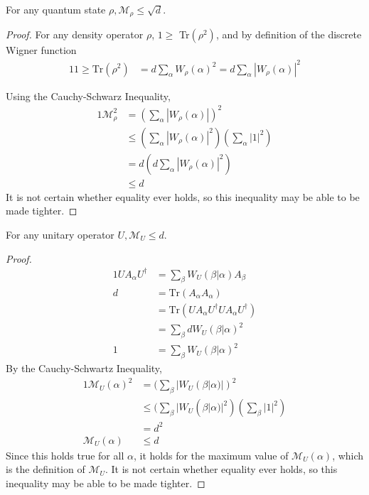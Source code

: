 \documentclass[../3Wworkreport.tex]{subfiles}
\begin{document}
\begin{prop}\label{prop:manarho}
For any quantum state $\rho, \mathcal{M}_\rho \le \sqrt{d}$.
\end{prop}
\begin{proof}
	For any density operator $\rho$, $1 \ge $ Tr$(\rho^2)$, and by definition of the discrete Wigner function
	\begin{alignat}{1}
		1 \ge \text{Tr}(\rho^2) &= d \sum\limits_\alpha W_\rho(\alpha)^2 = d \sum\limits_\alpha |W_\rho(\alpha)|^2
	\end{alignat}

	Using the Cauchy-Schwarz Inequality,
	\begin{alignat}{1}
		\mathcal{M}_\rho^2 &= (\sum\limits_\alpha |W_\rho(\alpha)|)^2\\
		& \le (\sum\limits_\alpha |W_\rho(\alpha)|^2) (\sum\limits_\alpha |1|^2)\\
		&= d (d \sum\limits_\alpha |W_\rho(\alpha)|^2)\\
		& \le d
	\end{alignat}
	It is not certain whether equality ever holds, so this inequality may be able to be made tighter.
\end{proof}
\newpage

\begin{prop}\label{prop:manaunitary}
For any unitary operator $U, \mathcal{M}_U \le d$.
\end{prop}
\begin{proof}
	\begin{alignat}{1}
		U A_\alpha U^\dag &= \sum\limits_\beta W_U (\beta | \alpha) A_\beta\\
		d &= \text{Tr}(A_\alpha A_\alpha)\\
		&= \text{Tr}(U A_\alpha U^\dag U A_\alpha U^\dag)\\
		&= \sum\limits_\beta d W_U(\beta | \alpha)^2\\
		1 &= \sum\limits_\beta W_U(\beta | \alpha)^2
	\end{alignat}
	By the Cauchy-Schwartz Inequality,
	\begin{alignat}{1}
		\mathcal{M}_U(\alpha)^2 &= (\sum\limits_\beta |W_U(\beta | \alpha)|)^2\\
		&\le (\sum\limits_\beta |W_U(\beta | \alpha)|^2) (\sum\limits_\beta |1|^2)\\
		&= d^2\\
		\mathcal{M}_U(\alpha) &\le d
	\end{alignat}
	Since this holds true for all $\alpha$, it holds for the maximum value of $\mathcal{M}_U(\alpha)$, which is the definition of $\mathcal{M}_U$. It is not certain whether equality ever holds, so this inequality may be able to be made tighter.
\end{proof}
\end{document}
